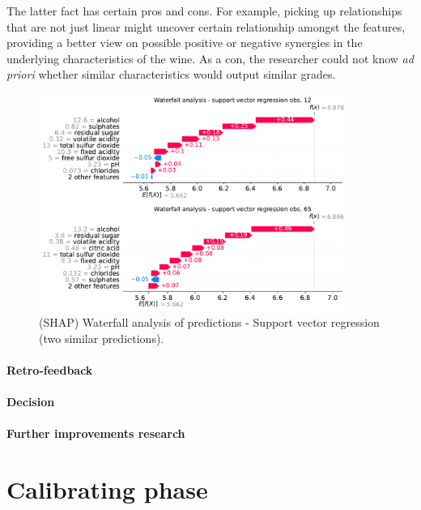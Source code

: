 \documentclass[11pt]{article}
\begin{document}
The latter fact has certain pros and cons.
For example, picking up relationships that are not just linear might uncover certain relationship amongst the features,
providing a better view on possible positive or negative synergies in the underlying characteristics of the wine.
As a con, the researcher could not know \emph{ad priori} whether similar characteristics would output similar grades.
\begin{figure}[h!]
    \centering
    \includegraphics[width=0.9\textwidth]{figs/shape_svr}
    \caption{(SHAP) Waterfall analysis of predictions - Support vector regression (two similar predictions).}
    \label{fig:shap_svr}
\end{figure}





\subsection{Retro-feedback}\label{subsec:retro-feedback}

\subsection{Decision}\label{subsec:decision}

\subsection{Further improvements research}\label{subsec:further-improvements-research}

\part{Calibrating phase} \label{part:calibrating}
\end{document}
